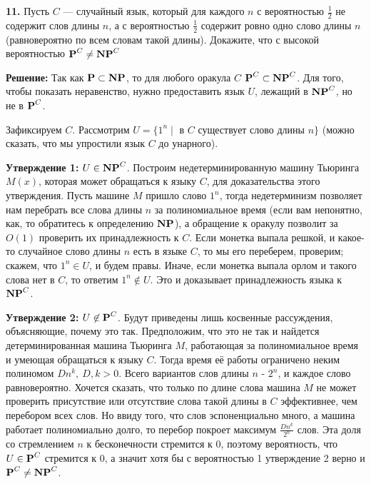 \textbf{11.} Пусть $C$ — случайный язык, который для каждого $n$ с вероятностью $\frac12$ не содержит слов длины $n$, а с вероятностью $\frac12$ содержит ровно одно слово длины $n$ (равновероятно по всем словам такой длины). Докажите, что с высокой вероятностью $\textbf{P}^C \neq \textbf{NP}^C$

\textbf{Решение:} Так как $\textbf{P} \subset \textbf{NP}$, то для любого оракула $C$ $\textbf{P}^C \subset \textbf{NP}^C$. Для того, чтобы показать неравенство, нужно предоставить язык $U$, лежащий в $\textbf{NP}^C$, но не в $\textbf{P}^C$.

Зафиксируем $C$. Рассмотрим $U = \{1^n \mid$ в $C$ существует слово длины $n\}$ (можно сказать, что мы упростили язык $C$ до унарного). 

\textbf{Утверждение 1:} $U \in \textbf{NP}^C$.  Построим недетерминированную машину Тьюринга $M(x)$, которая может обращаться к языку $C$, для доказательства этого утверждения. Пусть машине $M$ пришло слово $1^n$, тогда недетерминизм позволяет нам перебрать все слова длины $n$ за полиномиальное время (если вам непонятно, как, то обратитесь к определению $\textbf{NP}$), а обращение к оракулу позволит за $O(1)$ проверить их принадлежность к $C$. Если монетка выпала решкой, и какое-то случайное слово длины $n$ есть в языке $C$, то мы его переберем, проверим; скажем, что $1^n \in U$, и будем правы. Иначе, если монетка выпала орлом и такого слова нет в $C$, то ответим $1^n \not\in U$. Это и доказывает принадлежность языка к $\textbf{NP}^C$.

\textbf{Утверждение 2:} $U \not \in \textbf{P}^C$.  Будут приведены лишь косвенные рассуждения, объясняющие, почему это так. Предположим, что это не так и найдется детерминированная машина Тьюринга $M$, работающая за полиномиальное время и умеющая обращаться к языку $C$. Тогда время её работы ограничено неким полиномом $Dn^k,~ D,k>0$. Всего вариантов слов длины $n$ - $2^n$, и каждое слово равновероятно. Хочется сказать, что только по длине слова машина $M$ не может проверить присутствие или отсутствие слова такой длины в $C$ эффективнее, чем перебором всех слов. Но ввиду того, что слов эспоненциально много, а машина работает полиномиально долго, то перебор покроет максимум $\frac{Dn^k}{2^n}$ слов. Эта доля со стремлением $n$ к бесконечности стремится к 0, поэтому вероятность, что $U \in \textbf{P}^C$ стремится к 0, а значит хотя бы с вероятностью 1 утверждение 2 верно и $\textbf{P}^C \neq \textbf{NP}^C$. 
